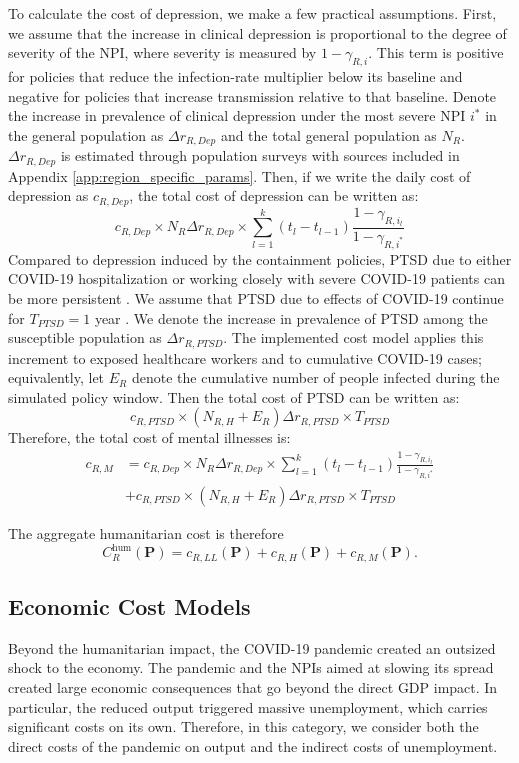 \documentclass[msom,blindrev]{informs3} %
\begin{document}
To calculate the cost of depression, we make a few practical assumptions. First, we assume that the increase in clinical depression is proportional to the degree of severity of the NPI, where severity is measured by $1-\gamma_{R,i}$. This term is positive for policies that reduce the infection-rate multiplier below its baseline and negative for policies that increase transmission relative to that baseline. Denote the increase in prevalence of clinical depression under the most severe NPI $i^*$ in the general population as $\Delta r_{R, Dep}$ and the total general population as $N_R$. $\Delta r_{R, Dep}$ is estimated through population surveys with sources included in Appendix \ref{app:region_specific_params}. Then, if we write the daily cost of depression as $c_{R, Dep}$, the total cost of depression can be written as:
\begin{equation}
    c_{R, Dep} \times N_R\Delta r_{R, Dep} \times \sum_{l=1}^k (t_l-t_{l-1}) \frac{1-\gamma_{R,i_l}}{1-\gamma_{R,i^*}}
\end{equation}
Compared to depression induced by the containment policies, PTSD due to either COVID-19 hospitalization or working closely with severe COVID-19 patients can be more persistent . We assume that PTSD due to effects of COVID-19 continue for $T_{PTSD}=1$ year . We denote the increase in prevalence of PTSD among the susceptible population as $\Delta r_{R,PTSD}$. The implemented cost model applies this increment to exposed healthcare workers and to cumulative COVID-19 cases; equivalently, let $E_R$ denote the cumulative number of people infected during the simulated policy window. Then the total cost of PTSD can be written as:
\begin{equation}
    c_{R,PTSD} \times (N_{R,H}+E_R)\Delta r_{R,PTSD} \times T_{PTSD}
\end{equation}
Therefore, the total cost of mental illnesses is:
\begin{align}
    c_{R,M} &=c_{R,Dep} \times N_R\Delta r_{R,Dep} \times \sum_{l=1}^k (t_l-t_{l-1}) \frac{1-\gamma_{R,i_l}}{1-\gamma_{R,i^*}}\nonumber \\&+c_{R,PTSD} \times (N_{R,H}+E_R)\Delta r_{R,PTSD} \times T_{PTSD}
\end{align}

The aggregate humanitarian cost is therefore
\[
C_R^{\mathrm{hum}}(\bm{P})=c_{R,LL}(\bm{P})+c_{R,H}(\bm{P})+c_{R,M}(\bm{P}).
\]




\subsection{Economic Cost Models}
\label{subsec:economic_cost}
Beyond the humanitarian impact, the COVID-19 pandemic created an outsized shock to the economy. The pandemic and the NPIs aimed at slowing its spread created large economic consequences that go beyond the direct GDP impact. In particular, the reduced output triggered massive unemployment, which carries significant costs on its own. Therefore, in this category, we consider both the direct costs of the pandemic on output and the indirect costs of unemployment.
\end{document}
